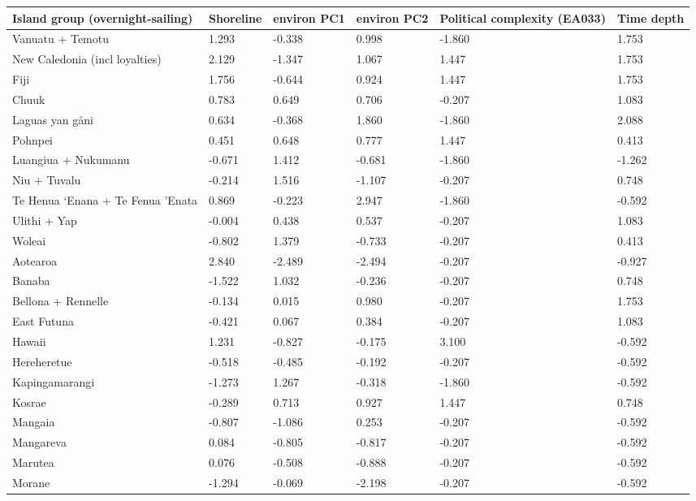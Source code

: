 \begin{longtable}{p{4.5cm}p{2cm}p{2cm}p{2cm}p{2cm}p{2cm}}
  \toprule
Island group (overnight-sailing) & Shoreline & environ PC1 & environ PC2 & Political complexity (EA033) & Time depth \\ 
  \midrule
Vanuatu + Temotu & 1.293 & -0.338 & 0.998 & -1.860 & 1.753 \\ 
  New Caledonia (incl loyalties) & 2.129 & -1.347 & 1.067 & 1.447 & 1.753 \\ 
  Fiji & 1.756 & -0.644 & 0.924 & 1.447 & 1.753 \\ 
  Chuuk & 0.783 & 0.649 & 0.706 & -0.207 & 1.083 \\ 
  Laguas yan gåni & 0.634 & -0.368 & 1.860 & -1.860 & 2.088 \\ 
  Pohnpei & 0.451 & 0.648 & 0.777 & 1.447 & 0.413 \\ 
  Luangiua + Nukumanu & -0.671 & 1.412 & -0.681 & -1.860 & -1.262 \\ 
  Niu + Tuvalu & -0.214 & 1.516 & -1.107 & -0.207 & 0.748 \\ 
  Te Henua ‘Enana + Te Fenua ’Enata & 0.869 & -0.223 & 2.947 & -1.860 & -0.592 \\ 
  Ulithi + Yap & -0.004 & 0.438 & 0.537 & -0.207 & 1.083 \\ 
  Woleai & -0.802 & 1.379 & -0.733 & -0.207 & 0.413 \\ 
  Aotearoa & 2.840 & -2.489 & -2.494 & -0.207 & -0.927 \\ 
  Banaba & -1.522 & 1.032 & -0.236 & -0.207 & 0.748 \\ 
  Bellona + Rennelle & -0.134 & 0.015 & 0.980 & -0.207 & 1.753 \\ 
  East Futuna & -0.421 & 0.067 & 0.384 & -0.207 & 1.083 \\ 
  Hawaii & 1.231 & -0.827 & -0.175 & 3.100 & -0.592 \\ 
  Hereheretue & -0.518 & -0.485 & -0.192 & -0.207 & -0.592 \\ 
  Kapingamarangi & -1.273 & 1.267 & -0.318 & -1.860 & -0.592 \\ 
  Kosrae & -0.289 & 0.713 & 0.927 & 1.447 & 0.748 \\ 
  Mangaia & -0.807 & -1.086 & 0.253 & -0.207 & -0.592 \\ 
  Mangareva & 0.084 & -0.805 & -0.817 & -0.207 & -0.592 \\ 
  Marutea & 0.076 & -0.508 & -0.888 & -0.207 & -0.592 \\ 
  Morane & -1.294 & -0.069 & -2.198 & -0.207 & -0.592 \\ 

\end{longtable}
